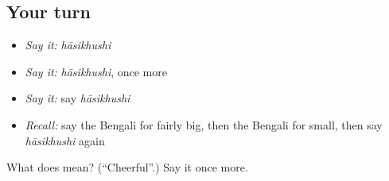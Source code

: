 \subsection*{Your turn}
\begin{itemize}
\raggedright
  \item \emph{Say it:} \emph{hāsikhushi}
  \item \emph{Say it:} \emph{hāsikhushi}, once more
  \item \emph{Say it:} say \emph{hāsikhushi}
  \item \emph{Recall:} say the Bengali for fairly big, then the Bengali for small, then say \emph{hāsikhushi} again
\end{itemize}

\begin{tcolorbox}[breakable,colback=teal!4,colframe=teal!35!black,title={Before you move on}]
What does  mean? (\textquotedblleft{}Cheerful\textquotedblright{}.) Say it once more.
\end{tcolorbox}
